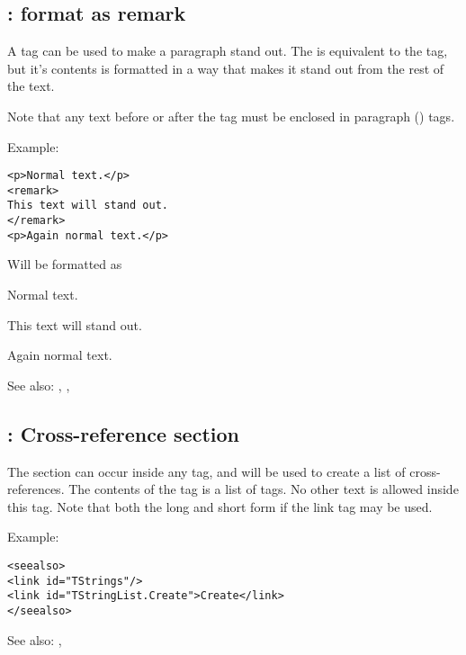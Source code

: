 \subsection{ : format as remark}
\label{tag:remark}
A  tag can be used to make a paragraph stand out. The
 is equivalent to the  tag, but it's contents is
formatted in a way that makes it stand out from the rest of the text.

Note that any text before or after the  tag must be enclosed in
paragraph () tags.

Example:
\begin{verbatim}
<p>Normal text.</p>
<remark>
This text will stand out.
</remark>
<p>Again normal text.</p>
\end{verbatim}
Will be formatted as

Normal text.
\begin{remark}
This text will stand out.
\end{remark}
Again normal text.

See also: , , 

\subsection{ : Cross-reference section}
\label{tag:seealso}
The  section can occur inside any  tag, and will
be used to create a list of cross-references. The contents of the
 tag is a list of  tags. No other text is allowed
inside this tag. Note that both the long and short form if the link tag may
be used.

Example:
\begin{verbatim}
<seealso>
<link id="TStrings"/>
<link id="TStringList.Create">Create</link>
</seealso>
\end{verbatim}

See also: , 

